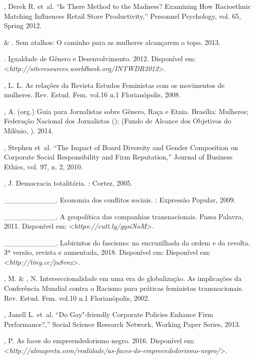 \begin{Parskip}
, Derek R. et~al. ``Is There Method to the Madness? Examining How
Racioethnic Matching Influences Retail Store Productivity,'' Personnel
Psychology, vol. 65, Spring 2012.

 \& . Sem atalhos: O caminho para as mulheres alcançarem o
topo. 2013.

. Igualdade de Gênero e Desenvolvimento. 2012.
Disponível em: \textless{}\emph{http://siteresources.worldbank.org/INTWDR2012}\textgreater{}.

, L. L. As relações da Revista Estudos Feministas com os
movimentos de mulheres. Rev. Estud. Fem. vol.16 n.1 Florianópolis, 2008.

, A. (org.) Guia para Jornalistas sobre Gênero, Raça e Etnia.
Brasília:  Mulheres; Federação Nacional dos Jornalistas ();
(Fundo de Alcance dos Objetivos do Milênio, ). 2014.

, Stephen et~al. ``The Impact of Board Diversity and Gender
Composition on Corporate Social Responsibility and Firm Reputation,''
Journal of Business Ethics, vol. 97, n. 2, 2010.

, J. Democracia totalitária. : Cortez, 2005.

\_\_\_\_\_\_\_\_\_\_. Economia dos conflitos sociais. : Expressão
Popular, 2009.

\_\_\_\_\_\_\_\_\_\_. A geopolítica das companhias transnacionais. Passa
Palavra, 2011. Disponível em: \textless{}\emph{https://cutt.ly/gysiNoM}\textgreater{}.

\_\_\_\_\_\_\_\_\_\_. Labirintos do fascismo: na encruzilhada da ordem e
da revolta. 3ª versão, revista e aumentada, 2018. Disponível em:
Disponível em: \textless{}\emph{http://tiny.cc/ju8vnz}\textgreater{}.

, M. \& , N. Interseccionalidade em uma era de
globalização. As implicações da Conferência Mundial contra o Racismo
para práticas feministas transnacionais. Rev. Estud. Fem. vol.10 n.1
Florianópolis, 2002.

, Janell L. et~al. ``Do Gay"-friendly Corporate Policies
Enhance Firm Performance?,'' Social Science Research Network, Working
Paper Series, 2013.

, P. As faces do empreendedorismo negro. 2016.
Disponível em: \textless{}\emph{http://almapreta.com/realidade/as-faces-do-empreendedorismo-negro/}\textgreater{}.


\end{Parskip}
